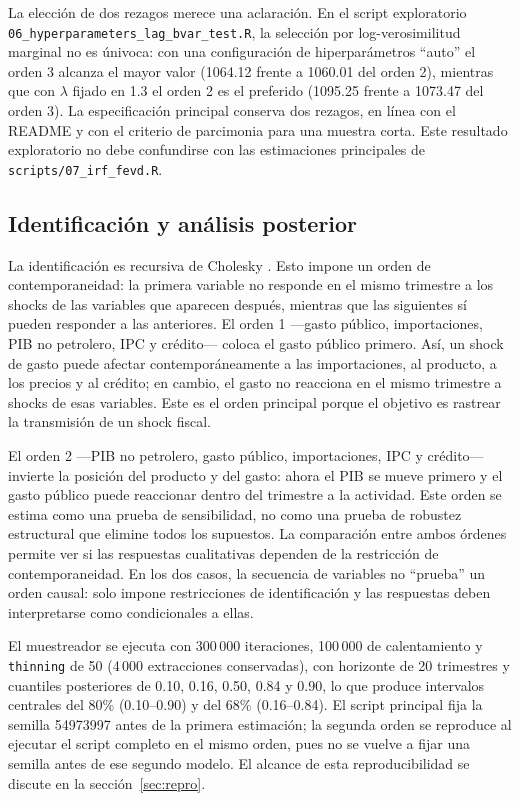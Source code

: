 \documentclass[11pt,a4paper]{article}
\begin{document}
La elección de dos rezagos merece una aclaración. En el script
exploratorio \texttt{06\_hyperparameters\_\allowbreak lag\_\allowbreak bvar\_test.R}, la
selección por log-verosimilitud marginal no es únivoca: con una
configuración de hiperparámetros ``auto'' el orden 3 alcanza el mayor
valor (1064.12 frente a 1060.01 del orden 2), mientras que con $\lambda$ fijado
en 1.3 el orden 2 es el preferido (1095.25 frente a 1073.47 del orden 3). La
especificación principal conserva dos rezagos, en línea con el
README y con el criterio de parcimonia para una muestra corta. Este resultado
exploratorio no debe confundirse con las estimaciones principales de
\texttt{scripts/07\_irf\_fevd.R}.

\subsection{Identificación y análisis posterior}
\label{sec:identificacion}

La identificación es recursiva de Cholesky \parencite{sims1980}. Esto impone
un orden de contemporaneidad: la primera variable no responde en el mismo
trimestre a los shocks de las variables que aparecen después, mientras que las
siguientes sí pueden responder a las anteriores. El orden 1
---gasto público, importaciones, PIB no petrolero, IPC y crédito--- coloca el
gasto público primero. Así, un shock de gasto puede afectar contemporáneamente
a las importaciones, al producto, a los precios y al crédito; en cambio, el
gasto no reacciona en el mismo trimestre a shocks de esas variables. Este es el
orden principal porque el objetivo es rastrear la transmisión de un shock
fiscal.

El orden 2 ---PIB no petrolero, gasto público, importaciones, IPC y crédito---
invierte la posición del producto y del gasto: ahora el PIB se mueve primero y
el gasto público puede reaccionar dentro del trimestre a la actividad. Este
orden se estima como una prueba de sensibilidad, no como una prueba de robustez
estructural que elimine todos los supuestos. La comparación entre ambos
órdenes permite ver si las respuestas cualitativas dependen de la restricción
de contemporaneidad. En los dos casos, la secuencia de variables no ``prueba''
un orden causal: solo impone restricciones de identificación y las respuestas
deben interpretarse como condicionales a ellas.

El muestreador se ejecuta con 300\,000 iteraciones, 100\,000 de calentamiento y
\texttt{thinning} de 50 (4\,000 extracciones conservadas), con horizonte de 20
trimestres y cuantiles posteriores de 0.10, 0.16, 0.50, 0.84 y 0.90, lo que
produce intervalos centrales del 80\% (0.10--0.90) y del 68\% (0.16--0.84). El
script principal fija la semilla 54973997 antes de la primera estimación; la
segunda orden se reproduce al ejecutar el script completo en el mismo orden,
pues no se vuelve a fijar una semilla antes de ese segundo modelo. El alcance de
esta reproducibilidad se discute en la sección~\ref{sec:repro}.
\end{document}
